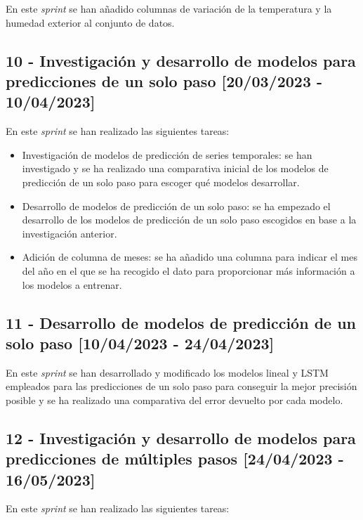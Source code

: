 En este \textit{sprint} se han añadido columnas de variación de la temperatura y la humedad exterior al conjunto de datos.

\subsection{10 - Investigación y desarrollo de modelos para predicciones de un solo paso [20/03/2023 - 10/04/2023]}

En este \textit{sprint} se han realizado las siguientes tareas:

\begin{itemize}
    \item Investigación de modelos de predicción de series temporales: se han investigado y se ha realizado una comparativa inicial de los modelos de predicción de un solo paso para escoger qué modelos desarrollar.
    \item Desarrollo de modelos de predicción de un solo paso: se ha empezado el desarrollo de los modelos de predicción de un solo paso escogidos en base a la investigación anterior.
    \item Adición de columna de meses: se ha añadido una columna para indicar el mes del año en el que se ha recogido el dato para proporcionar más información a los modelos a entrenar.
\end{itemize}

\subsection{11 - Desarrollo de modelos de predicción de un solo paso [10/04/2023 - 24/04/2023]}

En este \textit{sprint} se han desarrollado y modificado los modelos lineal y LSTM empleados para las predicciones de un solo paso para conseguir la mejor precisión posible y se ha realizado una comparativa del error devuelto por cada modelo.

\subsection{12 - Investigación y desarrollo de modelos para predicciones de múltiples pasos [24/04/2023 - 16/05/2023]}

En este \textit{sprint} se han realizado las siguientes tareas:

